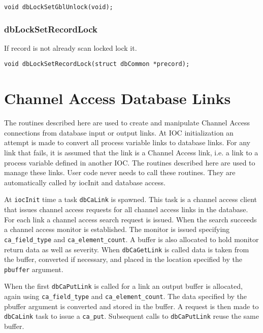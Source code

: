 \begin{verbatim}
void dbLockSetGblUnlock(void);
\end{verbatim}

\subsubsection{dbLockSetRecordLock}

If record is not already scan locked lock it.

\begin{verbatim}
void dbLockSetRecordLock(struct dbCommon *precord);
\end{verbatim}

\section{Channel Access Database Links}

The routines described here are used to create and manipulate Channel Access connections from database input or output links.
At IOC initialization an attempt is made to convert all process variable links to database links.
For any link that fails, it is assumed that the link is a Channel Access link, i.e. a link to a process variable defined in another IOC.
The routines described here are used to manage these links.
User code never needs to call these routines.
They are automatically called by iocInit and database access.

At \verb|iocInit| time a task \verb|dbCaLink| is spawned.
This task is a channel access client that issues channel access requests for all channel access links in the database.
For each link a channel access search request is issued.
When the search succeeds a channel access monitor is established.
The monitor is issued specifying \verb|ca_field_type| and \verb|ca_element_count|.
A buffer is also allocated to hold monitor return data as well as severity.
When \verb|dbCaGetLink| is called data is taken from the buffer, converted if necessary, and placed in the location specified by the \verb|pbuffer| 
argument.

When the first \verb|dbCaPutLink| is called for a link an output buffer is allocated, again using \verb|ca_field_type| and \verb|ca_element_count|.
The data specified by the pbuffer argument is converted and stored in the buffer.
A request is then made to \verb|dbCaLink| task to issue a \verb|ca_put|.
Subsequent calls to \verb|dbCaPutLink| reuse the same buffer.

